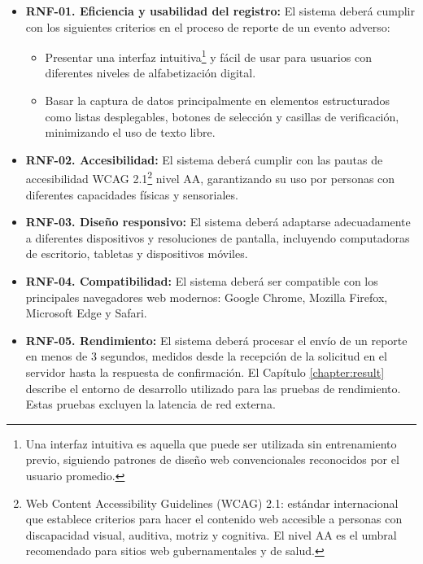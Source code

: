 \begin{itemize}

\item \textbf{RNF-01. Eficiencia y usabilidad del registro:}  
El sistema deberá cumplir con los siguientes criterios en el proceso de reporte de un evento adverso:
\begin{itemize}
    \item Presentar una interfaz intuitiva\footnote{Una interfaz intuitiva es aquella que puede ser utilizada sin entrenamiento previo, siguiendo patrones de diseño web convencionales reconocidos por el usuario promedio.} y fácil de usar para usuarios con diferentes niveles de alfabetización digital.
    \item Basar la captura de datos principalmente en elementos estructurados como listas desplegables, botones de selección y casillas de verificación, minimizando el uso de texto libre.
\end{itemize}

\item \textbf{RNF-02. Accesibilidad:}  
El sistema deberá cumplir con las pautas de accesibilidad WCAG 2.1\footnote{Web Content Accessibility Guidelines (WCAG) 2.1: estándar internacional que establece criterios para hacer el contenido web accesible a personas con discapacidad visual, auditiva, motriz y cognitiva. El nivel AA es el umbral recomendado para sitios web gubernamentales y de salud.} nivel AA, garantizando su uso por personas con diferentes capacidades físicas y sensoriales.

\item \textbf{RNF-03. Diseño responsivo:}  
El sistema deberá adaptarse adecuadamente a diferentes dispositivos y resoluciones de pantalla, incluyendo computadoras de escritorio, tabletas y dispositivos móviles.

\item \textbf{RNF-04. Compatibilidad:}  
El sistema deberá ser compatible con los principales navegadores web modernos: Google Chrome, Mozilla Firefox, Microsoft Edge y Safari.

\item \textbf{RNF-05. Rendimiento:}  
El sistema deberá procesar el envío de un reporte en menos de 3 segundos, medidos desde la recepción de la solicitud en el servidor hasta la respuesta de confirmación. 
El Capítulo \ref{chapter:result} describe el entorno de desarrollo utilizado para las pruebas de rendimiento. Estas pruebas excluyen la latencia de red externa.


\end{itemize}
